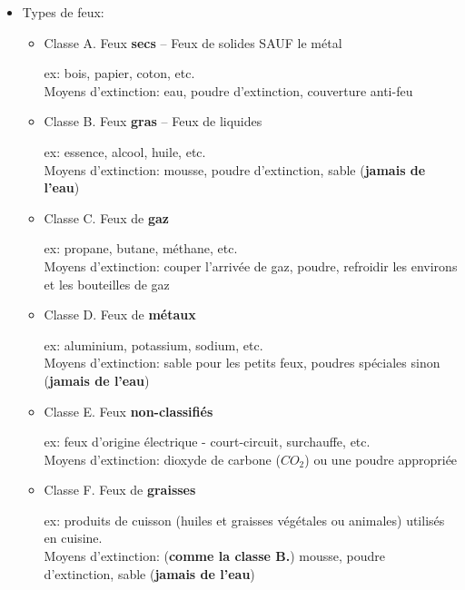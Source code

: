\documentclass[a4paper]{article}
\begin{document}
\begin{itemize}
\item Types de feux:
\begin{itemize}
    \item Classe A. Feux \textbf{secs} – Feux de solides SAUF le métal
    \begin{example}
        ex: bois, papier, coton, etc. \\
        Moyens d’extinction: eau, poudre d'extinction, couverture anti-feu
    \end{example}
    \item Classe B. Feux \textbf{gras} – Feux de liquides
    \begin{example}
        ex: essence, alcool, huile, etc. \\
        Moyens d’extinction: mousse, poudre d'extinction, sable (\textbf{jamais de l'eau})
    \end{example}
    \item Classe C. Feux de \textbf{gaz}
        \begin{example}
        ex: propane, butane, méthane, etc. \\
        Moyens d’extinction: couper l'arrivée de gaz, poudre, refroidir les environs et les bouteilles de gaz
    \end{example}
    \item Classe D. Feux de \textbf{métaux}
    \begin{example}
        ex: aluminium, potassium, sodium, etc. \\
        Moyens d’extinction: sable pour les petits feux, poudres spéciales sinon (\textbf{jamais de l'eau})
    \end{example}
    \item Classe E. Feux \textbf{non-classifiés}
    \begin{example}
        ex: feux d'origine électrique - court-circuit, surchauffe, etc. \\
        Moyens d’extinction: dioxyde de carbone ($ CO_2 $) ou une poudre appropriée
    \end{example}
    \item Classe F. Feux de \textbf{graisses}
    \begin{example}
        ex: produits de cuisson (huiles et graisses végétales ou animales) utilisés en cuisine. \\
        Moyens d’extinction: (\textbf{comme la classe B.}) mousse, poudre d'extinction, sable (\textbf{jamais de l'eau})
    \end{example}
\end{itemize}






\end{itemize}
\end{document}
